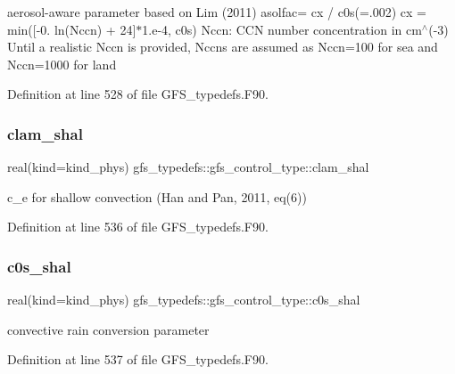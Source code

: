 aerosol-\/aware parameter based on Lim (2011) asolfac= cx / c0s(=.002) cx = min([-\/0. ln(\+Nccn) + 24]$\ast$1.e-\/4, c0s) Nccn\+: C\+CN number concentration in cm$^\wedge$(-\/3) Until a realistic Nccn is provided, Nccns are assumed as Nccn=100 for sea and Nccn=1000 for land 



Definition at line 528 of file G\+F\+S\+\_\+typedefs.\+F90.

\mbox{\label{structgfs__typedefs_1_1gfs__control__type_afae87538077377112cabc9a590d3fa29}} 
\subsubsection{clam\+\_\+shal}
{\footnotesize\ttfamily real(kind=kind\+\_\+phys) gfs\+\_\+typedefs\+::gfs\+\_\+control\+\_\+type\+::clam\+\_\+shal}



c\+\_\+e for shallow convection (Han and Pan, 2011, eq(6)) 



Definition at line 536 of file G\+F\+S\+\_\+typedefs.\+F90.

\mbox{\label{structgfs__typedefs_1_1gfs__control__type_ab39cf17f572e32d553d8141c9a46941a}} 
\subsubsection{c0s\+\_\+shal}
{\footnotesize\ttfamily real(kind=kind\+\_\+phys) gfs\+\_\+typedefs\+::gfs\+\_\+control\+\_\+type\+::c0s\+\_\+shal}



convective rain conversion parameter 



Definition at line 537 of file G\+F\+S\+\_\+typedefs.\+F90.

\mbox{\label{structgfs__typedefs_1_1gfs__control__type_afbaaba449a7371f92a076016a13183d9}} 
